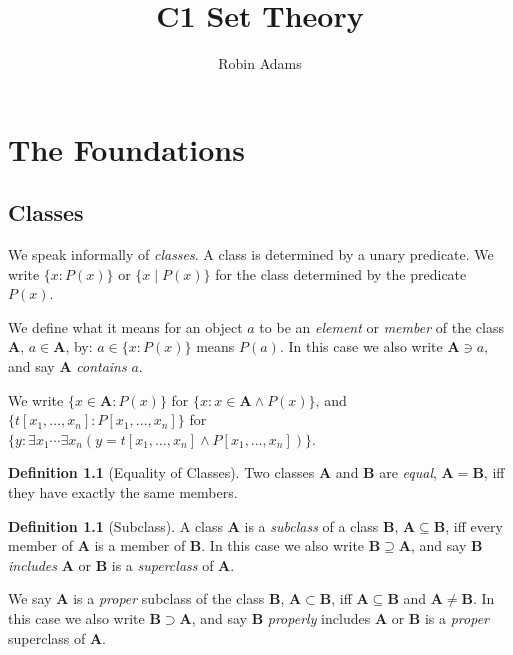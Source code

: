 \documentclass{report}
\title{C1 Set Theory}
\author{Robin Adams}
\theoremstyle{definition}
\newtheorem{definition}[axiom]{Definition}
\begin{document}
    \maketitle

    \chapter{The Foundations}

    \section{Classes}

    We speak informally of \emph{classes}. A class is determined by a unary predicate. We write 
    $\{ x : P(x) \}$ or $\{ x \mid P(x) \}$ for the class determined by the predicate $P(x)$.

    We define what it means for an object $a$ to be an \emph{element} or \emph{member} of the class $\mathbf{A}$, $a \in \mathbf{A}$,
    by: $a \in \{ x : P(x) \}$ means $P(a)$. In this case we also write $\mathbf{A} \ni a$, and say
    $\mathbf{A}$ \emph{contains} $a$.

    We write $\{ x \in \mathbf{A} : P(x) \}$ for $\{ x : x \in \mathbf{A} \wedge P(x) \}$,
    and $\{ t[x_1, \ldots, x_n] : P[x_1, \ldots, x_n] \}$ for $\{ y : \exists x_1 \cdots \exists x_n
    (y = t[x_1, \ldots, x_n] \wedge P[x_1, \ldots, x_n]) \}$.

    \begin{definition}[Equality of Classes]
        Two classes $\mathbf{A}$ and $\mathbf{B}$ are \emph{equal}, $\mathbf{A} = \mathbf{B}$,
        iff they have exactly the same members.
    \end{definition}

    \begin{definition}[Subclass]
        A class $\mathbf{A}$ is a \emph{subclass} of a class $\mathbf{B}$,
        $\mathbf{A} \subseteq \mathbf{B}$, iff every member of $\mathbf{A}$
        is a member of $\mathbf{B}$. In this case we also write $\mathbf{B} \supseteq \mathbf{A}$,
        and say $\mathbf{B}$ \emph{includes} $\mathbf{A}$ or $\mathbf{B}$ is a \emph{superclass} of
        $\mathbf{A}$.

        We say $\mathbf{A}$ is a \emph{proper} subclass of the class $\mathbf{B}$,
        $\mathbf{A} \subset \mathbf{B}$, iff $\mathbf{A} \subseteq \mathbf{B}$ and $\mathbf{A} \neq
        \mathbf{B}$. In this case we also write $\mathbf{B} \supset \mathbf{A}$, and say $\mathbf{B}$
        \emph{properly} includes $\mathbf{A}$ or $\mathbf{B}$ is a \emph{proper} superclass of $\mathbf{A}$.
    \end{definition}
\end{document}
